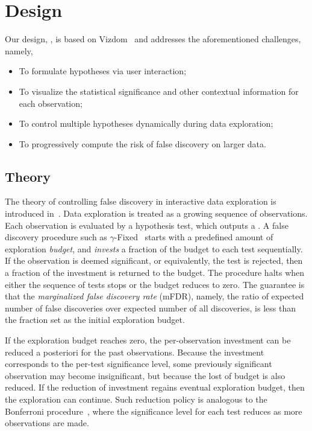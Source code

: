 \section{Design}
\label{sec:design}
Our design, \system{}, is based on Vizdom~\cite{vizdom} and addresses the aforementioned challenges, namely,
\begin{itemize}
    \item To formulate hypotheses via user interaction;
    \item To visualize the statistical significance and other contextual information for each observation;
    \item To control multiple hypotheses dynamically during data exploration;
    \item To progressively compute the risk of false discovery on larger data.
\end{itemize}

\subsection{Theory}
\label{sec:theory}
The theory of controlling false discovery in interactive data exploration is introduced in~\cite{zhao2016controlling}. Data exploration is treated as a growing sequence of observations.  Each observation is evaluated by a hypothesis test, which outputs a \pval. A false discovery procedure such as $\gamma$-Fixed~\cite{zhao2016controlling} starts with a predefined amount of exploration \textit{budget}, and \textit{invests} a fraction of the budget to each test sequentially.  If the observation is deemed significant, or equivalently, the test is rejected, then a fraction of the investment is returned to the budget. The procedure halts when either the sequence of tests stops or the budget reduces to zero.  The guarantee is that the \textit{marginalized false discovery rate} (mFDR), namely, the ratio of expected number of false discoveries over expected number of all discoveries, is less than the fraction set as the initial exploration budget.

If the exploration budget reaches zero, the per-observation investment can be reduced a posteriori for the past observations.  Because the investment corresponds to the per-test significance level, some previously significant observation may become insignificant, but because the lost of budget is also reduced.  If the reduction of investment regains eventual exploration budget, then the exploration can continue.  Such reduction policy is analogous to the Bonferroni procedure~\cite{bonferroni1936teoria}, where the significance level for each test reduces as more observations are made.

